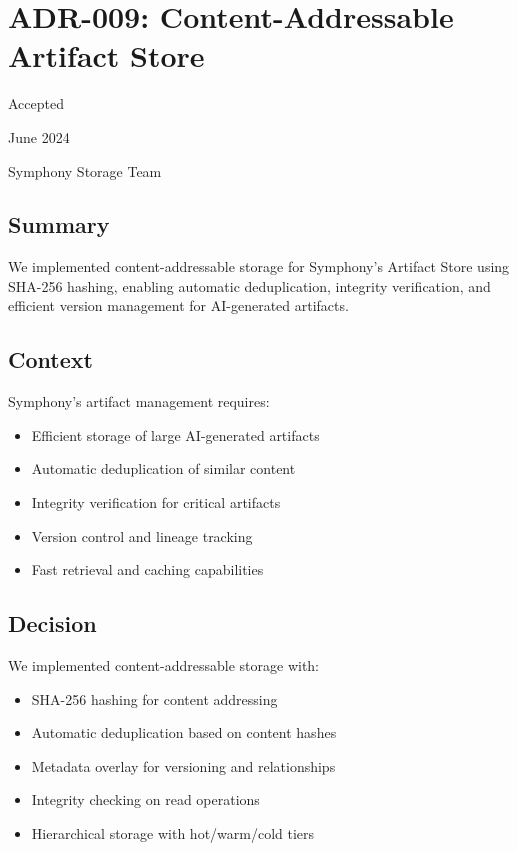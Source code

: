 \section*{ADR-009: Content-Addressable Artifact Store}

\begin{description}[leftmargin=3cm,labelwidth=2.5cm]
\item[\textbf{Status}] Accepted
\item[\textbf{Date}] June 2024
\item[\textbf{Authors}] Symphony Storage Team
\end{description}

\subsection*{Summary}

We implemented content-addressable storage for Symphony's Artifact Store using SHA-256 hashing, enabling automatic deduplication, integrity verification, and efficient version management for AI-generated artifacts.

\subsection*{Context}

Symphony's artifact management requires:
\begin{itemize}
\item Efficient storage of large AI-generated artifacts
\item Automatic deduplication of similar content
\item Integrity verification for critical artifacts
\item Version control and lineage tracking
\item Fast retrieval and caching capabilities
\end{itemize}

\subsection*{Decision}

We implemented content-addressable storage with:
\begin{itemize}
\item SHA-256 hashing for content addressing
\item Automatic deduplication based on content hashes
\item Metadata overlay for versioning and relationships
\item Integrity checking on read operations
\item Hierarchical storage with hot/warm/cold tiers
\end{itemize}

